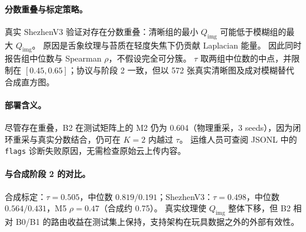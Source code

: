 \paragraph{分数重叠与标定策略。}
真实 ShezhenV3 验证对存在分数重叠：清晰组的最小 $Q_{\mathrm{img}}$ 可能低于模糊组的最大 $Q_{\mathrm{img}}$。
原因是舌象纹理与苔质在轻度失焦下仍贡献 Laplacian 能量。
因此同时报告组中位数与 Spearman $\rho$，不假设完全可分簇。
$\tau$ 取两组中位数的中点，并限制在 $[0.45,0.65]$；协议与阶段 2 一致，但以 572 张真实清晰图及成对模糊替代合成直方图。

\paragraph{部署含义。}
尽管存在重叠，B2 在测试矩阵上的 M2 仍为 0.604（物理重采，3 seeds），因为闭环重采与真实分数结合，仍可在 $K{=}2$ 内越过 $\tau$。
运维人员可查阅 JSONL 中的 \texttt{flags} 诊断失败原因，无需检查原始云上传内容。

\paragraph{与合成阶段 2 的对比。}
合成标定：$\tau{=}0.505$，中位数 $0.819/0.191$；ShezhenV3：$\tau{=}0.498$，中位数 $0.564/0.431$，M5 $\rho{=}0.47$（合成约 0.75）。
真实纹理使 $Q_{\mathrm{img}}$ 整体下移，但 B2 相对 B0/B1 的路由收益在测试集上保持，支持架构在玩具数据之外的外部有效性。
